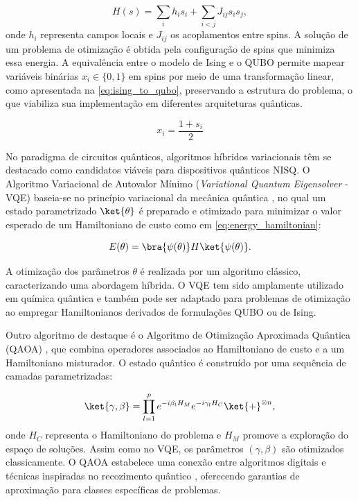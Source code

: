 \begin{equation}
    \label{eq:ising_hamiltonian}
    H(s) = \sum_i h_i s_i + \sum_{i<j} J_{ij} s_i s_j,
\end{equation}
onde $h_i$ representa campos locais e $J_{ij}$ os acoplamentos entre spins. A solução de um problema de otimização é obtida pela configuração de spins que minimiza essa energia. A equivalência entre o modelo de Ising e o QUBO permite mapear variáveis binárias $x_i \in \{0,1\}$ em spins por meio de uma transformação linear, como apresentada na \autoref{eq:ising_to_qubo}, preservando a estrutura do problema, o que viabiliza sua implementação em diferentes arquiteturas quânticas.

\begin{equation}
    \label{eq:ising_to_qubo}
    x_i=\frac{1+s_i}{2}
\end{equation}

No paradigma de circuitos quânticos, algoritmos híbridos variacionais têm se destacado como candidatos viáveis para dispositivos quânticos NISQ. O Algoritmo Variacional de Autovalor Mínimo (\textit{Variational Quantum Eigensolver} - VQE) baseia-se no princípio variacional da mecânica quântica \cite{cerezo2021variational,peruzzo2014variational}, no qual um estado parametrizado $\ket{\theta}$ é preparado e otimizado para minimizar o valor esperado de um Hamiltoniano de custo como em \autoref{eq:energy_hamiltonian}:

\begin{equation}
    \label{eq:energy_hamiltonian}
    E(\theta) = \bra{\psi(\theta)} H \ket{\psi(\theta)}.
\end{equation}

A otimização dos parâmetros $\theta$ é realizada por um algoritmo clássico, caracterizando uma abordagem híbrida. O VQE tem sido amplamente utilizado em química quântica \cite{cao2019quantum} e também pode ser adaptado para problemas de otimização \cite{moll2018quantum} ao empregar Hamiltonianos derivados de formulações QUBO ou de Ising.

Outro algoritmo de destaque é o Algoritmo de Otimização Aproximada Quântica (QAOA) \cite{farhi_quantum_2014}, que combina operadores associados ao Hamiltoniano de custo e a um Hamiltoniano misturador. O estado quântico é construído por uma sequência de camadas parametrizadas:

\begin{equation}
    \ket{\gamma, \beta} = \prod_{l=1}^{p} e^{-i \beta_l H_M} e^{-i \gamma_l H_C} \ket{+}^{\otimes n},
\end{equation}
onde $H_C$ representa o Hamiltoniano do problema e $H_M$ promove a exploração do espaço de soluções. Assim como no VQE, os parâmetros $(\gamma, \beta)$ são otimizados classicamente. O QAOA estabelece uma conexão entre algoritmos digitais \cite{farhi_quantum_2014} e técnicas inspiradas no recozimento quântico \cite{zhou2020quantum}, oferecendo garantias de aproximação para classes específicas de problemas.

